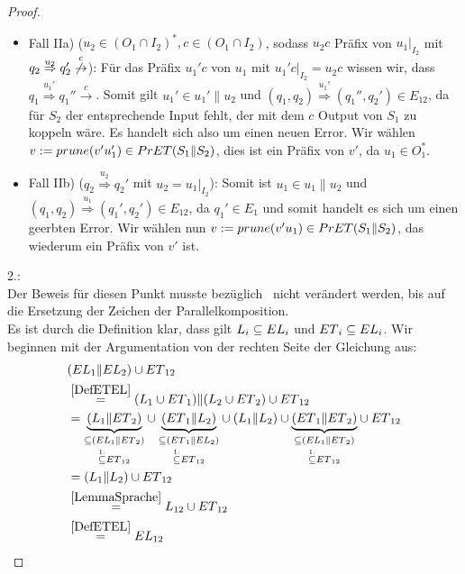 \begin{proof}
\begin{itemize}
\begin{itemize}
      \item Fall IIa) ($u_2\in (O_1\cap I_2)^*, c\in (O_1\cap I_2)$, sodass
        $u_2c$ Präfix von $u_1|_{I_2}$ mit $q_2 \overset{u_2}{\Rightarrow} q_2'
        \overset{c}{\not{\hspace{-0.1cm}\rightarrow}}$): Für das Präfix $u_1'c$
        von $u_1$ mit $u_1'c|_{I_2}=u_2c$ wissen wir, dass $q_1
        \overset{u_1'}{\Rightarrow} q_1'' \overset{c}{\rightarrow}$. Somit gilt
        $u_1'\in u_1'\|u_2$ und $(q_1,q_2) \overset{u_1'}{\Rightarrow}
        (q_1'',q_2')\in E_{12}$, da für $S_2$ der entsprechende Input fehlt,
        der mit dem $c$ Output von $S_1$ zu koppeln wäre. Es handelt sich also
        um einen neuen Error. Wir wählen $v:=prune{}(v'u_1')\in PrET{}(S_1\| S_2)$,
        dies ist ein Präfix von $v'$, da $u_1\in O_1^*$.
      \item Fall IIb) ($q_2 \overset{u_2}{\Rightarrow} q_2'$ mit
        $u_2=u_1|_{I_2}$): Somit ist $u_1\in u_1\|u_2$ und $(q_1,q_2)
        \overset{u_1}{\Rightarrow} (q_1',q_2')\in E_{12}$, da $q_1'\in E_1$ und
        somit handelt es sich um einen geerbten Error. Wir wählen nun $v:=prune{}
        (v'u_1)\in PrET{}(S_1\|S_2)$, das wiederum ein Präfix von $v'$ ist.
    \end{itemize}
  \end{itemize}

  2.:\\
  Der Beweis für diesen Punkt musste bezüglich~\cite{Vogler2014EIO} nicht
  verändert werden, bis auf die Ersetzung der Zeichen der Parallelkomposition.\\
  Es ist durch die Definition klar, dass gilt $L_i\subseteq EL{}_i$ und
  $ET{}_i\subseteq EL{}_i$. Wir beginnen mit der Argumentation von der rechten
  Seite der Gleichung aus:
  \begin{align*}
    &(EL{}_1\| EL{}_2)\cup ET{}_{12}\\
    &\overset{\ref{DefETEL}}{=}(L_1\cup ET{}_1)\|(L_2\cup ET{}_2)\cup ET{}_{12}\\
    &=\underset{\overset{1.}{\subseteq} ET{}_{12}}{\underset{\subseteq
    (EL{}_1\|ET{}_2)}{\underbrace{(L_1\|ET{}_2)}}} \cup
    \underset{\overset{1.}{\subseteq} ET{}_{12}}{\underset{\subseteq
    (ET{}_1\|EL{}_2)}{\underbrace{(ET{}_1\|L_2)}}} \cup
    (L_1\|L_2) \cup \underset{\overset{1.}{\subseteq}
    ET{}_{12}}{\underset{\subseteq (EL{}_1\|ET{}_2)}{\underbrace{(ET{}_1\|ET{}_2)}}} \cup
    ET{}_{12}\\
    &=(L_1\|L_2) \cup ET{}_{12}\\
    &\overset{\ref{LemmaSprache}}{=}L_{12}\cup ET{}_{12}\\
    &\overset{\ref{DefETEL}}{=}EL{}_{12}
  \end{align*}
\end{proof}

